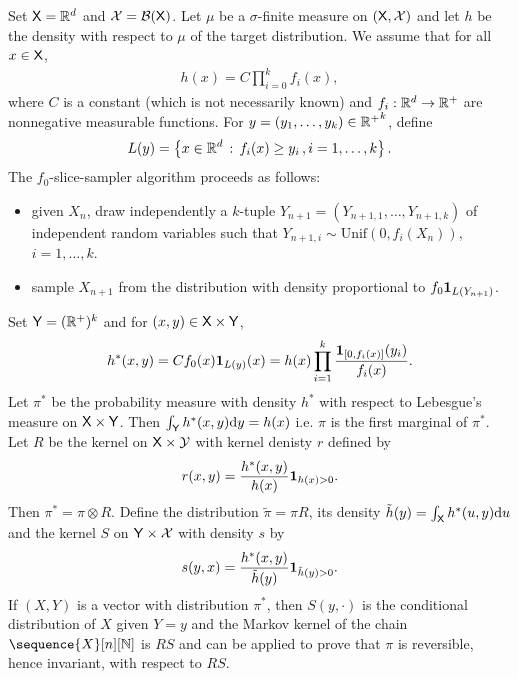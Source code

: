 \documentclass[english,graybox,envcountchap,envcountsame,sectrefs,shortlabels]{svmono}
\theoremstyle{style}
\newcommand{\Yset}{\mathsf{Y}}
\newcommand{\Ysigma}{\mathcal{Y}}
\newcommand{\eqsp}{}
\begin{document}
\begin{example} 
  \label{ex:slice:one} 
Set $\mathsf{X}=\mathbb{R}^d$ and $\mathcal{X}=\mathcal{B}(\mathsf{X})$. Let $\mu$ be a $\sigma$-finite measure on
$(\mathsf{X},\mathcal{X})$ and let $h$ be the density with respect to $\mu$ of the target distribution. We
assume that for all $x \in \mathsf{X}$,
%
\begin{align*}
  h(x) = C\prod_{i=0}^k f_i(x) \eqsp ,
\end{align*}
where $C$ is a constant (which is not necessarily known) and $f_i: \mathbb{R}^d \to \mathbb{R}^+$ are
nonnegative measurable functions.  For $y =(y_1,\ldots,y_k)\in {\mathbb{R}^+}^k$, define
\begin{align*}
  L(y) = \set{x\in \rset^d}{f_i(x)\geq y_i\,, \eqsp i=1,\ldots, k} \eqsp .
\end{align*}
%
The  $f_0$-slice-sampler algorithm proceeds as follows:
\begin{itemize}
\item given $X_n$, draw independently a $k$-tuple $Y_{n+1}=(Y_{n+1,1}, \dots, Y_{n+1,k})$ of
  independent random variables such that $Y_{n+1,i} \sim \mathrm{Unif}(0,f_i(X_n))$, $i=1,\dots,k$.
\item sample $X_{n+1}$ from the %
  distribution with density proportional to $f_0\mathbf{1}_{L(Y_{n+1})}$.
\end{itemize}
Set $\Yset=(\rset^+)^k$ and for $(x,y) \in \Xset \times \Yset$,
\begin{align*}
  h^*(x,y)=C f_0(x) \indi{L(y)}(x) = h(x) \prod_{i=1}^k
  \frac{\indi{[0,f_i(x)]}(y_i)}{f_i(x)} \eqsp .
\end{align*}
Let $\pi^*$ be the probability measure with density $h^*$ with respect to Lebesgue's measure on
$\Xset\times\Yset$. Then $\int_{\Yset}h^*(x,y)\rmd y = h(x)$ i.e. $\pi$ is the first marginal of
$\pi^*$. Let $R$ be the kernel on $\Xset\times\Ysigma$ with kernel denisty $r$ defined by
\begin{align*}
  r(x,y) = \frac{h^*(x,y)}{h(x)} \indi{h(x)>0} \eqsp .
\end{align*}
Then $\pi^* = \pi\otimes R$. Define the distribution $\tilde\pi=\pi R$, its density $\tilde{h}(y) =
\int_{\mathsf{X}} h^*(u,y) \mathrm{d} u$ and the kernel $S$ on $\Yset\times\Xsigma$ with density $s$ by
\begin{align*}
  s(y,x) = \frac{h^*(x,y)}{\tilde{h}(y)} \indi{\tilde{h}(y)>0} \eqsp .
\end{align*}
If $(X,Y)$ is a vector with distribution $\pi^*$, then $S(y,\cdot)$ is the conditional distribution
of $X$ given $Y=y$ and the Markov kernel of the chain $\sequence{X}[n][\nset]$ is $RS$ and
 can be applied to prove that $\pi$ is reversible, hence invariant, with respect
to $RS$.
\end{example}
\end{document}
